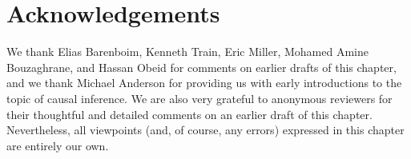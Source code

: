 \section{Acknowledgements}
We thank Elias Barenboim, Kenneth Train, Eric Miller, Mohamed Amine Bouzaghrane, and Hassan Obeid for comments on earlier drafts of this chapter, and we thank Michael Anderson for providing us with early introductions to the topic of causal inference. We are also very grateful to anonymous reviewers for their thoughtful and detailed comments on an earlier draft of this chapter. Nevertheless, all viewpoints (and, of course, any errors) expressed in this chapter are entirely our own.



